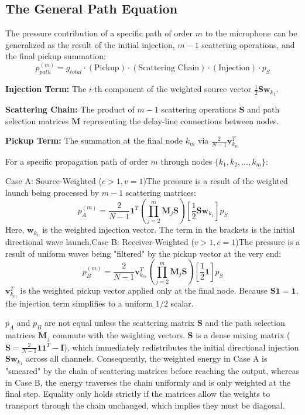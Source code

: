 \documentclass[conference]{IEEEtran}
\begin{document}
\subsection{\textbf{The General Path Equation}}

The pressure contribution of a specific path of order $m$ to the microphone can be generalized as the result of the initial injection, $m-1$ scattering operations, and the final pickup summation:
$$p_{path}^{(m)} = g_{total} \cdot \left( \text{Pickup} \right) \cdot \left( \text{Scattering Chain} \right) \cdot \left( \text{Injection} \right) \cdot p_S$$

\textbf{Injection Term:} The $i$-th component of the weighted source vector $\frac{1}{2}\mathbf{S}\mathbf{w}_{k_1}$.

\textbf{Scattering Chain:} The product of $m-1$ scattering operations $\mathbf{S}$ and path selection matrices $\mathbf{M}$ representing the delay-line connections between nodes.

\textbf{Pickup Term:} The summation at the final node $k_m$ via $\frac{2}{N-1}\mathbf{v}_{k_m}^T$

For a specific propagation path of order $m$ through nodes $\{k_1, k_2, \dots, k_m\}$:

Case A: Source-Weighted ($c > 1, v = 1$)The pressure is a result of the weighted launch being processed by $m-1$ scattering matrices:$$p_{A}^{(m)} = \frac{2}{N-1} \mathbf{1}^T \left( \prod_{j=2}^{m} \mathbf{M}_{j} \mathbf{S} \right) \left[ \frac{1}{2} \mathbf{S} \mathbf{w}_{k_1} \right] p_S$$Here, $\mathbf{w}_{k_1}$ is the weighted injection vector. The term in the brackets is the initial directional wave launch.Case B: Receiver-Weighted ($v > 1, c = 1$)The pressure is a result of uniform waves being "filtered" by the pickup vector at the very end:$$p_{B}^{(m)} = \frac{2}{N-1} \mathbf{v}_{k_m}^T \left( \prod_{j=2}^{m} \mathbf{M}_{j} \mathbf{S} \right) \left[ \frac{1}{2} \mathbf{1} \right] p_S$$$\mathbf{v}_{k_m}^T$ is the weighted pickup vector applied only at the final node. Because $\mathbf{S}\mathbf{1} = \mathbf{1}$, the injection term simplifies to a uniform $1/2$ scalar.

$p_A$ and $p_B$ are not equal unless the scattering matrix $\mathbf{S}$ and the path selection matrices $\mathbf{M}_j$ commute with the weighting vectors. $\mathbf{S}$ is a dense mixing matrix ($\mathbf{S} = \frac{2}{N-1}\mathbf{1}\mathbf{1}^T - \mathbf{I}$), which immediately redistributes the initial directional injection $\mathbf{S}\mathbf{w}_{k_1}$ across all channels. Consequently, the weighted energy in Case A is "smeared" by the chain of scattering matrices before reaching the output, whereas in Case B, the energy traverses the chain uniformly and is only weighted at the final step. Equality only holds strictly if the matrices allow the weights to transport through the chain unchanged, which implies they must be diagonal.
\end{document}
